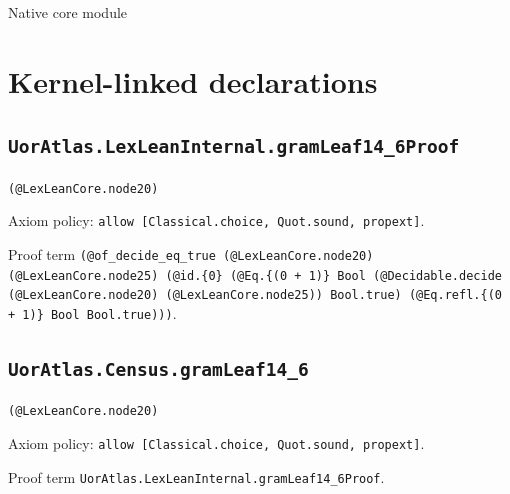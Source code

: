 \documentclass[11pt]{article}
\begin{document}
\begin{center}{\LARGE Native core module}\end{center}
\section*{Kernel-linked declarations}
\subsection*{\texttt{UorAtlas.LexLeanInternal.gramLeaf14\_6Proof}}
\noindent\texttt{(@LexLeanCore.node20)}\par
\noindent Axiom policy: \texttt{allow [Classical.choice, Quot.sound, propext]}.\par
\noindent Proof term \texttt{(@of\_decide\_eq\_true (@LexLeanCore.node20) (@LexLeanCore.node25) (@id.\{0\} (@Eq.\{(0 + 1)\} Bool (@Decidable.decide (@LexLeanCore.node20) (@LexLeanCore.node25)) Bool.true) (@Eq.refl.\{(0 + 1)\} Bool Bool.true)))}.\par
\subsection*{\texttt{UorAtlas.Census.gramLeaf14\_6}}
\noindent\texttt{(@LexLeanCore.node20)}\par
\noindent Axiom policy: \texttt{allow [Classical.choice, Quot.sound, propext]}.\par
\noindent Proof term \texttt{UorAtlas.LexLeanInternal.gramLeaf14\_6Proof}.\par
\end{document}
